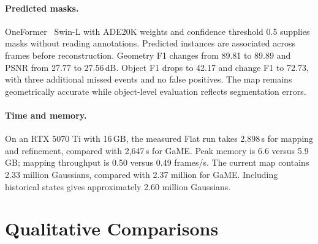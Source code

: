 \paragraph{Predicted masks.}
OneFormer~\cite{jain2023oneformer} Swin-L with ADE20K weights and confidence threshold 0.5 supplies masks without reading annotations.
Predicted instances are associated across frames before reconstruction.
Geometry F1 changes from 89.81 to 89.89 and PSNR from 27.77 to 27.56\,dB. Object F1 drops to 42.17 and
change F1 to 72.73, with three additional missed events and no false positives. The map remains geometrically
accurate while object-level evaluation reflects segmentation errors.

\paragraph{Time and memory.}
On an RTX 5070 Ti with 16\,GB, the measured Flat run takes 2,898\,s for mapping and refinement, compared with
2,647\,s for GaME. Peak memory is 6.6 versus 5.9\,GB; mapping throughput is 0.50 versus 0.49 frames/s.
The current map contains 2.33 million Gaussians, compared with 2.37 million for GaME. Including historical
states gives approximately 2.60 million Gaussians.

\section{Qualitative Comparisons}


